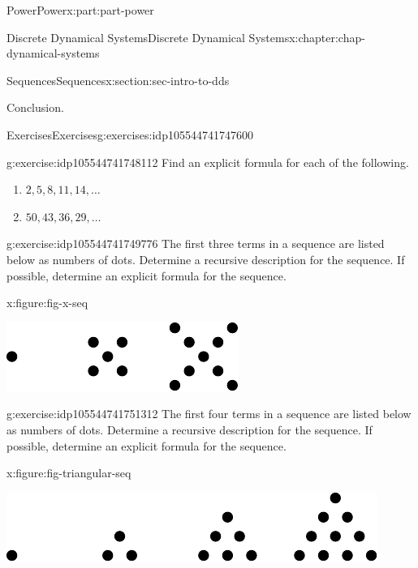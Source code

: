 \documentclass[oneside,10pt,]{book}
\numberwithin{equation}{section}
\begin{document}
\begin{partptx}{Power}{}{Power}{}{}{x:part:part-power}
\begin{chapterptx}{Discrete Dynamical Systems}{}{Discrete Dynamical Systems}{}{}{x:chapter:chap-dynamical-systems}
\begin{sectionptx}{Sequences}{}{Sequences}{}{}{x:section:sec-intro-to-dds}
\begin{conclusion}{Conclusion.}
\end{conclusion}%
%
%
\typeout{************************************************}
\typeout{************************************************}
%
\begin{exercises-subsection-numberless}{Exercises}{}{Exercises}{}{}{g:exercises:idp105544741747600}
\begin{divisionexercise}{1}{}{}{g:exercise:idp105544741748112}%
Find an explicit formula for each of the following.%
%
\begin{enumerate}[label=(\alph*)]
\item{}\(\displaystyle 2, 5, 8, 11, 14, \ldots\)%
\item{}\(\displaystyle 50, 43, 36, 29, \ldots\)%
\end{enumerate}
\end{divisionexercise}%
\begin{divisionexercise}{2}{}{}{g:exercise:idp105544741749776}%
The first three terms in a sequence are listed below as numbers of dots. Determine a recursive description for the sequence. If possible, determine an explicit formula for the sequence.%
\begin{figureptx}{}{x:figure:fig-x-seq}{}%
\begin{image}{0}{1}{0}%
\includegraphics[width=\linewidth]{./images/x.pdf}
\end{image}%
\tcblower
\end{figureptx}%
\end{divisionexercise}%
\begin{divisionexercise}{3}{}{}{g:exercise:idp105544741751312}%
The first four terms in a sequence are listed below as numbers of dots. Determine a recursive description for the sequence. If possible, determine an explicit formula for the sequence.%
\begin{figureptx}{}{x:figure:fig-triangular-seq}{}%
\begin{image}{0}{1}{0}%
\includegraphics[width=\linewidth]{./images/triangular.pdf}

\end{image}
\end{figureptx}
\end{divisionexercise}
\end{exercises-subsection-numberless}
\end{sectionptx}
\end{chapterptx}
\end{partptx}
\end{document}
